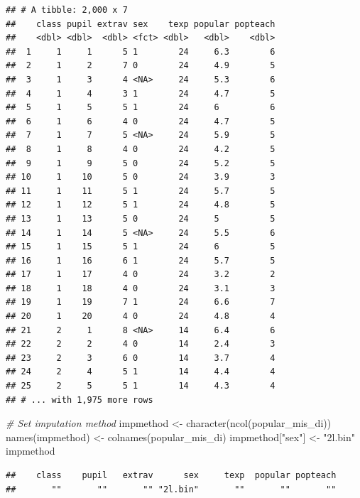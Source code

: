 \documentclass[
]{book}
\newenvironment{Shaded}{\begin{snugshade}}{\end{snugshade}}
\newcommand{\CommentTok}[1]{\textcolor[rgb]{0.56,0.35,0.01}{\textit{#1}}}
\newcommand{\FunctionTok}[1]{\textcolor[rgb]{0.00,0.00,0.00}{#1}}
\newcommand{\NormalTok}[1]{#1}
\newcommand{\OtherTok}[1]{\textcolor[rgb]{0.56,0.35,0.01}{#1}}
\newcommand{\StringTok}[1]{\textcolor[rgb]{0.31,0.60,0.02}{#1}}
\begin{document}
\begin{verbatim}
## # A tibble: 2,000 x 7
##    class pupil extrav sex    texp popular popteach
##    <dbl> <dbl>  <dbl> <fct> <dbl>   <dbl>    <dbl>
##  1     1     1      5 1        24     6.3        6
##  2     1     2      7 0        24     4.9        5
##  3     1     3      4 <NA>     24     5.3        6
##  4     1     4      3 1        24     4.7        5
##  5     1     5      5 1        24     6          6
##  6     1     6      4 0        24     4.7        5
##  7     1     7      5 <NA>     24     5.9        5
##  8     1     8      4 0        24     4.2        5
##  9     1     9      5 0        24     5.2        5
## 10     1    10      5 0        24     3.9        3
## 11     1    11      5 1        24     5.7        5
## 12     1    12      5 1        24     4.8        5
## 13     1    13      5 0        24     5          5
## 14     1    14      5 <NA>     24     5.5        6
## 15     1    15      5 1        24     6          5
## 16     1    16      6 1        24     5.7        5
## 17     1    17      4 0        24     3.2        2
## 18     1    18      4 0        24     3.1        3
## 19     1    19      7 1        24     6.6        7
## 20     1    20      4 0        24     4.8        4
## 21     2     1      8 <NA>     14     6.4        6
## 22     2     2      4 0        14     2.4        3
## 23     2     3      6 0        14     3.7        4
## 24     2     4      5 1        14     4.4        4
## 25     2     5      5 1        14     4.3        4
## # ... with 1,975 more rows
\end{verbatim}

\begin{Shaded}
\begin{Highlighting}[]
\CommentTok{\# Set imputation method}
\NormalTok{impmethod }\OtherTok{\textless{}{-}} \FunctionTok{character}\NormalTok{(}\FunctionTok{ncol}\NormalTok{(popular\_mis\_di))}
\FunctionTok{names}\NormalTok{(impmethod) }\OtherTok{\textless{}{-}} \FunctionTok{colnames}\NormalTok{(popular\_mis\_di)}
\NormalTok{impmethod[}\StringTok{"sex"}\NormalTok{] }\OtherTok{\textless{}{-}} \StringTok{"2l.bin"}
\NormalTok{impmethod}
\end{Highlighting}
\end{Shaded}

\begin{verbatim}
##    class    pupil   extrav      sex     texp  popular popteach 
##       ""       ""       "" "2l.bin"       ""       ""       ""
\end{verbatim}
\end{document}

